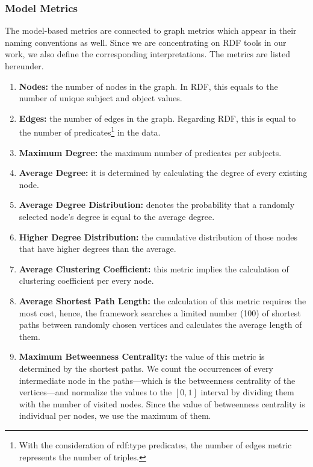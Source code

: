 \subsubsection{Model Metrics}
The model-based metrics are connected to graph metrics which appear in their naming conventions as well. Since we are concentrating on RDF tools in our work, we also define the corresponding interpretations. The metrics are listed hereunder.
\begin{enumerate}
	\item{\textbf{Nodes:}} the number of nodes in the graph. In RDF, this equals to the number of unique subject and object values.
	\item{\textbf{Edges:}} the number of edges in the graph. Regarding RDF, this is equal to the number of predicates\footnote{With the consideration of \textsf{rdf:type} predicates, the number of edges metric represents the number of triples.} in the data.
	\item{\textbf{Maximum Degree:}} the maximum number of predicates per subjects.
	\item{\textbf{Average Degree:}} it is determined by calculating the degree of every existing node.
	\item{\textbf{Average Degree Distribution:}} denotes the probability that a randomly selected node’s degree is equal to the average degree.
	\item{\textbf{Higher Degree Distribution:}} the cumulative distribution of those nodes that have higher degrees than the average.
	\item{\textbf{Average Clustering Coefficient:}} this metric implies the calculation of clustering coefficient per every node.
	\item{\textbf{Average Shortest Path Length:}} the calculation of this metric requires the most cost, hence, the framework searches a limited number (100) of shortest paths between randomly chosen vertices and calculates the average length of them.
	\item{\textbf{Maximum Betweenness Centrality:}} the value of this metric is determined by the shortest paths. We count the occurrences of every intermediate node in the paths---which is the betweenness centrality of the vertices---and normalize the values to the $[0,1]$ interval by dividing them with the number of visited nodes. Since the value of betweenness centrality is individual per nodes, we use the maximum of them.
\end{enumerate}

